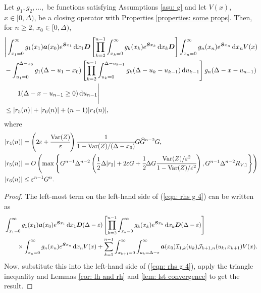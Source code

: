 \begin{cor}\label{cor: a cor}
        Let \(g_1,g_2,\dots,\) be functions satisfying Assumptions \ref{asu: g} and let \(V(x)\), \(x\in[0,\Delta)\), be a closing operator with Properties \ref{properties: some props}. Then, for \(n\geq 2\), \(x_0\in[0,\Delta)\), 
	\begin{align}
		&\Bigg| \int_{x_1=0}^\infty g_1(x_1) \boldsymbol a (x_0) e^{\boldsymbol{S}x_1}\, \mathrm{d} x_1\boldsymbol D 
            	\left[\prod_{k=2}^{n-1}\int_{x_k=0}^\infty g_k(x_k) e^{\boldsymbol{S}x_k} \, \mathrm{d} x_k \boldsymbol D\right] \int_{x_n=0}^\infty g_{n}(x_n) e^{\boldsymbol{S}x_n} \, \mathrm{d} x_n V(x) \nonumber 
		\\&{}- \int_{u_1=0}^{\Delta-x_0}g_1(\Delta - u_1 - x_0)
		\left[\prod_{k=2}^{n-1} \int_{u_k=0}^{\Delta-u_{k-1}} g_k(\Delta-u_k-u_{k-1})\, \mathrm{d} u_{k-1}\right] \nonumber 
            	g_{n}(\Delta - x-u_{n-1})
	\\&\qquad{} 1(\Delta-x-u_{n-1}\geq0) \, \mathrm{d} u_{n-1} \Bigg| \nonumber
		\\&\leq |r_5(n)| + |r_6(n)| + (n-1)|r_4(n)|, \label{eqn: rhs g 4}
	\end{align}
	where 
	\begin{align*}
		|r_4(n)| &= \left(2\varepsilon + \cfrac{\mathrm{Var}(Z)}{\varepsilon}\right) \cfrac{1}{1-\mathrm{Var}(Z)/(\Delta-x_0)} G \widehat G^{n-2} G ,
		\\|r_5(n)|&= O\left(\max\left\{G^{n-1}\Delta^{n-2}\left(\frac{1}{2}\Delta|r_2 |+ 2\varepsilon G 
		+ \cfrac{1}{2}\Delta G\cfrac{\mathrm{Var}(Z)/\varepsilon^2}{1-\mathrm{Var}(Z)/\varepsilon^2}\right),
		G^{n-1}\Delta^{n-2}R_{V,1}\right\}\right)
		\\|r_6(n)| &\leq\varepsilon^{n-1}G^n.
	\end{align*}
\end{cor}
\begin{proof}
	The left-most term on the left-hand side of (\ref{eqn: rhs g 4}) can be written as 
	\begin{align}
		&\int_{x_1=0}^\infty g_1(x_1) \boldsymbol a (x_0)e^{\boldsymbol{S}x_1}\, \mathrm{d} x_1\boldsymbol D(\Delta-\varepsilon)
            	\left[\prod_{k=2}^{n-1}\int_{x_k=0}^\infty g_k(x_k) e^{\boldsymbol{S}x_k} \, \mathrm{d} x_k \boldsymbol D(\Delta-\varepsilon)\right]
            	\\&\qquad \times\int_{x_n=0}^\infty g_{n}(x_n) e^{\boldsymbol{S}x_n} \, \mathrm{d} x_n V(x) \nonumber 
	+\sum_{k=1}^{n-1} \int_{x_{k+1}=0}^\infty \int_{u_k=\Delta-\varepsilon}^\infty \boldsymbol a(x_0)\mathcal I_{1,k}(u_k) \mathcal J_{k+1,n}(u_k,x_{k+1})V(x). \nonumber
	\end{align}
	 Now, substitute this into the left-hand side of (\ref{eqn: rhs g 4}), apply the triangle inequality and Lemmas \ref{cor: lh and rh} and \ref{lem: lst convergence} to get the result.  
\end{proof}

